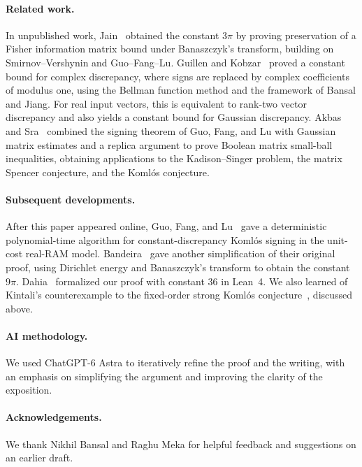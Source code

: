 \documentclass{article}
\begin{document}
\paragraph{Related work.}
In unpublished work, Jain~\cite{jain2026fisher} obtained the constant
$3\pi$ by proving preservation of a Fisher information matrix bound
under Banaszczyk's transform, building on Smirnov--Vershynin and
Guo--Fang--Lu.
Guillen and Kobzar~\cite{guillen2026complex} proved a constant bound
for complex discrepancy, where signs are replaced by complex
coefficients of modulus one, using the Bellman function method
and the framework of Bansal and Jiang.
For real input vectors, this is equivalent to rank-two vector
discrepancy and also yields a constant bound for Gaussian discrepancy.
Akbas and Sra~\cite{akbas2026boolean} combined the signing theorem of
Guo, Fang, and Lu with Gaussian matrix estimates and a replica
argument to prove Boolean matrix small-ball inequalities, obtaining
applications to the Kadison--Singer problem, the matrix Spencer
conjecture, and the Koml\'os conjecture.

\paragraph{Subsequent developments.}
After this paper appeared online, Guo, Fang, and Lu~\cite{guo2026polynomial} gave a
deterministic polynomial-time algorithm for constant-discrepancy
Koml\'os signing in the unit-cost real-RAM model.
Bandeira~\cite{bandeira2026simplification} gave another simplification
of their original proof, using Dirichlet energy and Banaszczyk's
transform to obtain the constant $9\pi$.
Dahia~\cite{dahia2026komlos} formalized our proof with constant $36$
in Lean~4.
We also learned of Kintali's counterexample to the fixed-order
strong Koml\'os conjecture~\cite{kintali2026strong}, discussed above.

\paragraph{AI methodology.}
We used ChatGPT-6 Astra to iteratively refine the proof and the
writing, with an emphasis on simplifying the argument and improving
the clarity of the exposition.

\paragraph{Acknowledgements.}
We thank Nikhil Bansal and Raghu Meka for helpful feedback and suggestions on an earlier draft.
\end{document}

